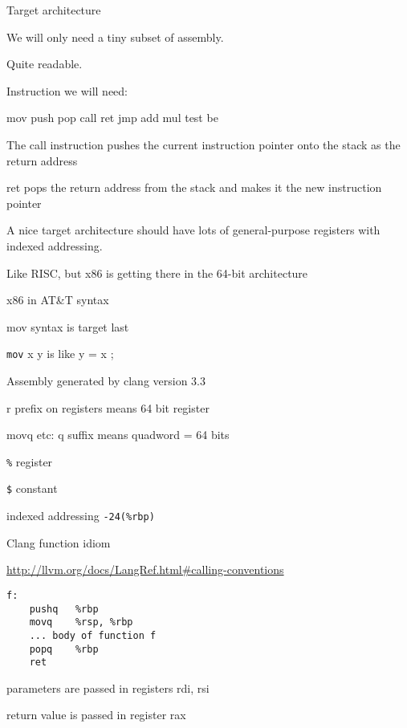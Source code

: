 \documentclass[landscape]{beamer}
\begin{document}
\begin{frame}{Target architecture}

We will only need a tiny subset of assembly.

Quite readable.

Instruction we will need:

mov push pop call ret jmp add mul test be

The call instruction pushes the current instruction pointer onto the stack as the return address

ret pops the return address from the stack and makes it the new instruction pointer

A nice target architecture should have lots of general-purpose registers with indexed addressing.

Like RISC, but x86 is getting there in the 64-bit architecture

\end{frame}

\begin{frame}{x86 in AT\&T syntax}

mov syntax is target last

\texttt{mov} x y is like y = x ;

Assembly generated by clang version 3.3

r prefix on registers means 64 bit register

movq etc: q suffix means quadword = 64 bits

\texttt{\%} register

\texttt{\$} constant

indexed addressing \texttt{-24(\%rbp)}

\end{frame}


\begin{frame}[fragile]{Clang function idiom}

\url{http://llvm.org/docs/LangRef.html#calling-conventions}

\begin{verbatim}
f:
	pushq	%rbp
	movq	%rsp, %rbp
    ... body of function f
	popq	%rbp
	ret
\end{verbatim}

parameters are passed in registers rdi, rsi

return value is passed in register rax
\end{frame}
\end{document}
